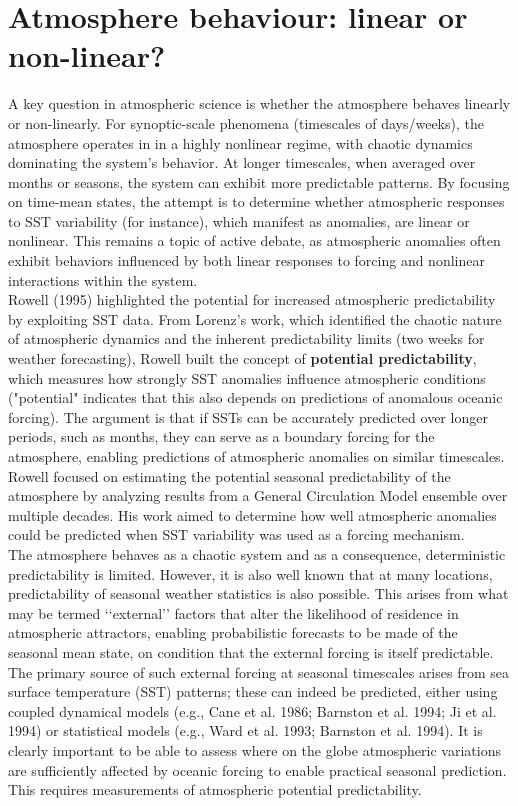 \section{Atmosphere behaviour: linear or non-linear?}
A key question in atmospheric science is whether the atmosphere behaves linearly or non-linearly. For synoptic-scale phenomena (timescales of days/weeks), the atmosphere operates in in a highly nonlinear regime, with chaotic dynamics dominating the system's behavior. At longer timescales, when averaged over months or seasons, the system can exhibit more predictable patterns. By focusing on time-mean states, the attempt is to determine whether atmospheric responses to SST variability (for instance), which manifest as anomalies, are linear or nonlinear. This remains a topic of active debate, as atmospheric anomalies often exhibit behaviors influenced by both linear responses to forcing and nonlinear interactions within the system.
\\[0.2 cm]

Rowell (1995)\cite{Rowell1995} highlighted the potential for increased atmospheric predictability by exploiting SST data. From Lorenz's work, which identified the chaotic nature of atmospheric dynamics and the inherent predictability limits (two weeks for weather forecasting), Rowell built the concept of \textbf{potential predictability}, which measures how strongly SST anomalies influence atmospheric conditions ("potential" indicates that this also depends on predictions of
anomalous oceanic forcing). The argument is that if SSTs can be accurately predicted over longer periods, such as months, they can serve as a boundary forcing for the atmosphere, enabling predictions of atmospheric anomalies on similar timescales. \\
Rowell focused on estimating the potential seasonal predictability of the atmosphere by analyzing results from a General Circulation Model ensemble over multiple decades. His work aimed to determine how well atmospheric anomalies could be predicted when SST variability was used as a forcing mechanism. \\



The atmosphere behaves as a chaotic system and as a consequence, deterministic predictability is limited.
However, it is also well known that at many locations, predictability of seasonal weather statistics is also
possible. This arises from what may be termed ‘‘external’’ factors that alter the likelihood of residence in
atmospheric attractors, enabling probabilistic forecasts to be made of the seasonal mean state, on
condition that the external forcing is itself predictable.
The primary source of such external forcing at seasonal timescales arises from sea surface temperature
(SST) patterns; these can indeed be predicted, either using coupled dynamical models (e.g., Cane et al.
1986; Barnston et al. 1994; Ji et al. 1994) or statistical models (e.g., Ward et al. 1993; Barnston et al. 1994).
It is clearly important to be able to assess where on the globe atmospheric variations are sufficiently
affected by oceanic forcing to enable practical seasonal prediction. This requires measurements of
atmospheric potential predictability.

